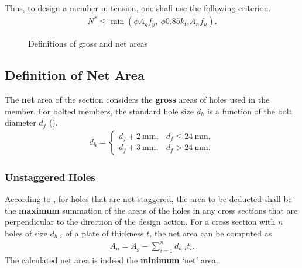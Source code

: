 Thus, to design a member in tension, one shall use the following criterion.
\begin{gather}
N^*\leqslant\min\left(\phi{}A_gf_y,~\phi{}0.85k_{te}A_nf_u\right).
\end{gather}
\begin{figure}[H]
\centering\footnotesize

\caption{Definitions of gross and net areas}
\end{figure}
\subsection{Definition of Net Area}
The \textbf{net} area of the section considers the \textbf{gross} areas of holes used in the member.
For bolted members, the standard hole size $d_h$ is a function of the bolt diameter $d_f$ ().
\begin{gather}\label{eq:dh}
d_h=\left\{
\begin{array}{ll}
d_f+\SI{2}{\mm},&d_f\leqslant\SI{24}{\mm},\\
d_f+\SI{3}{\mm},&d_f>\SI{24}{\mm}.
\end{array}
\right.
\end{gather}
\subsubsection{Unstaggered Holes}
According to , for holes that are not staggered, the area to be deducted shall be the \textbf{maximum} summation of the areas of the holes in any cross sections that are perpendicular to the direction of the design action.
For a cross section with $n$ holes of size $d_{h,i}$ of a plate of thickness $t$, the net area can be computed as
\begin{gather}\label{eq:unstaggered}
A_n=A_g-\sum_{i=1}^{n}d_{h,i}t_i.
\end{gather}
The calculated net area is indeed the \textbf{minimum} `net' area.
